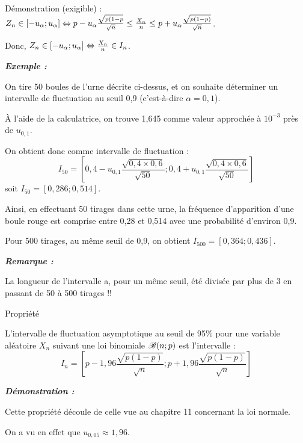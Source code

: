 \begin{spacing}{1.2}
\begin{bclogo}[couleur = yellow!30 , arrondi = 0.1 ,logo = \bclampe , barre = snake , tailleOndu = 1.5]{Démonstration (exigible) :}
$Z_n\in [-u_{\alpha};u_{\alpha}] \Leftrightarrow p-u_{\alpha}\frac{\sqrt{p(1-p}}{\sqrt{n}}\leq \frac{X_n}{n}\leq p+u_{\alpha}\frac{\sqrt{p(1-p)}}{\sqrt{n}}$.

Donc, $Z_n\in [-u_{\alpha};u_{\alpha}] \Leftrightarrow \frac{X_n}{n}\in I_n$.
\end{bclogo}

\bigskip

\textbf{\textit{Exemple :}}

On tire 50 boules de l'urne décrite ci-dessus, et on souhaite déterminer un intervalle de fluctuation au seuil 0,9 (c'est-à-dire $\alpha=0,1$).

À l'aide de la calculatrice, on trouve 1,645 comme valeur approchée à $10^{-3}$ près de $u_{0,1}$.

On obtient donc comme intervalle de fluctuation :
\[I_{50}=\left[0,4-u_{0,1}\frac{\sqrt{0,4\times 0,6}}{\sqrt{50}};0,4+u_{0,1}\frac{\sqrt{0,4\times 0,6}}{\sqrt{50}}\right]\]
soit $I_{50}=[0,286;0,514]$.

Ainsi, en effectuant 50 tirages dans cette urne, la fréquence d'apparition d'une boule rouge est comprise entre 0,28 et 0,514 avec une probabilité d'environ 0,9.

Pour 500 tirages, au même seuil de 0,9, on obtient $I_{500}=[0,364;0,436]$.

\medskip

\textbf{\textit{Remarque :}}

La longueur de l'intervalle a, pour un même seuil, été divisée par plus de 3 en passant de 50 à 500 tirages \quad !!

\medskip

\begin{bclogo}[couleur = gray!30 , arrondi = 0.1 ,logo = \bclampe , barre = snake , tailleOndu = 1.5]{Propriété}

L'intervalle de fluctuation asymptotique au seuil de 95\% pour une variable aléatoire $X_n$ suivant une loi binomiale $\mathscr{B}(n;p)$ est l'intervalle :
\[I_n=\left[p-1,96\frac{\sqrt{p(1-p)}}{\sqrt{n}};p+1,96\frac{\sqrt{p(1-p)}}{\sqrt{n}}\right]\]

\end{bclogo}

\bigskip

\textbf{\textit{Démonstration :}}

Cette propriété découle de celle vue au chapitre 11 concernant la loi normale.

On a vu en effet que $u_{0,05}\approx 1,96$.

\medskip


\end{spacing}
